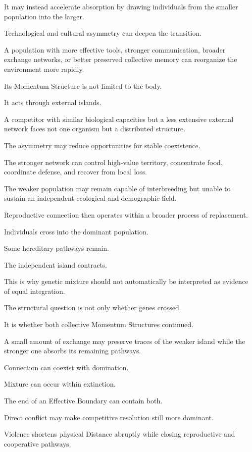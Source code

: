 It may instead accelerate absorption by drawing individuals from the smaller population into the larger.

Technological and cultural asymmetry can deepen the transition.

A population with more effective tools, stronger communication, broader exchange networks, or better preserved collective memory can reorganize the environment more rapidly.

Its Momentum Structure is not limited to the body.

It acts through external islands.

A competitor with similar biological capacities but a less extensive external network faces not one organism but a distributed structure.

The asymmetry may reduce opportunities for stable coexistence.

The stronger network can control high-value territory, concentrate food, coordinate defense, and recover from local loss.

The weaker population may remain capable of interbreeding but unable to sustain an independent ecological and demographic field.

Reproductive connection then operates within a broader process of replacement.

Individuals cross into the dominant population.

Some hereditary pathways remain.

The independent island contracts.

This is why genetic mixture should not automatically be interpreted as evidence of equal integration.

The structural question is not only whether genes crossed.

It is whether both collective Momentum Structures continued.

A small amount of exchange may preserve traces of the weaker island while the stronger one absorbs its remaining pathways.

Connection can coexist with domination.

Mixture can occur within extinction.

The end of an Effective Boundary can contain both.

Direct conflict may make competitive resolution still more dominant.

Violence shortens physical Distance abruptly while closing reproductive and cooperative pathways.

